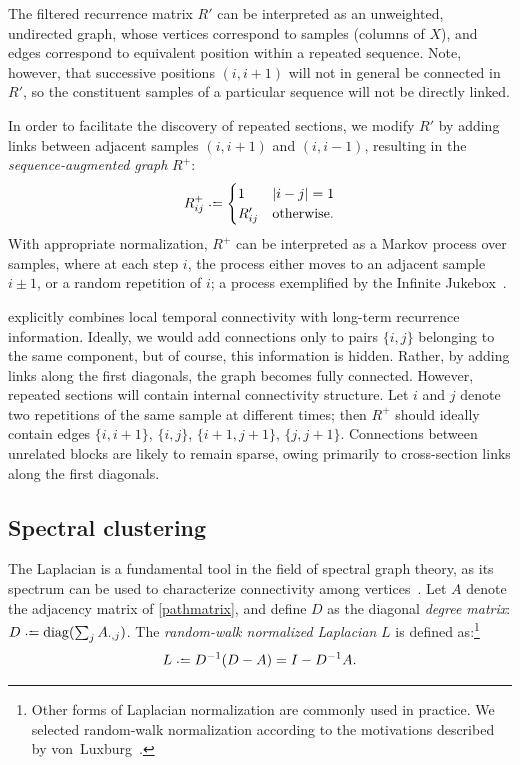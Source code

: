 \documentclass{article}
\begin{document}
The filtered recurrence matrix $R'$ can be interpreted as an unweighted, undirected 
graph, whose vertices correspond to samples (columns of $X$), and edges correspond 
to equivalent position within a repeated sequence. Note, however, that successive 
positions $(i, i+1)$ will not in general be connected in $R'$, so the constituent 
samples of a particular sequence will not be directly linked.

In order to facilitate the discovery of repeated sections, we modify $R'$ by 
adding links between adjacent samples $(i, i+1)$ and $(i, i-1)$, resulting in the
\emph{sequence-augmented graph} $R^+$:
\begin{equation}
R^+_{ij} \defeq \begin{cases}
1 & |i - j| = 1\\
R'_{ij} & \text{otherwise}.
\end{cases}\label{pathmatrix}
\end{equation}
With appropriate normalization, $R^+$ can be interpreted as a Markov process
over samples, where at each step $i$, the process either moves to an adjacent
sample $i\pm1$, or a random repetition of $i$; a process exemplified by the 
Infinite Jukebox~\cite{infinitejukebox}.

 explicitly combines local temporal connectivity with long-term
recurrence information.  Ideally, we would add connections only to pairs $\{i,j\}$
belonging to the same component, but of course, this information is hidden.  Rather,
by adding links along the first diagonals, the graph becomes fully connected.  
However, repeated sections will contain internal connectivity structure.  Let $i$ and
$j$ denote two repetitions of the same sample at different times; then $R^+$ should
ideally contain edges $\{i, i+1\}$, $\{i, j\}$, $\{i+1, j+1\}$, $\{j, j+1\}$.
Connections between unrelated blocks are likely to remain sparse, owing primarily to
cross-section links along the first diagonals.  


\subsection{Spectral clustering}

The Laplacian is a fundamental tool in the field of spectral graph
theory, as its spectrum can be used to characterize 
connectivity among vertices~\cite{chung1997spectral}.  
Let $A$ denote the adjacency matrix of \cref{pathmatrix}, and define $D$ as the
diagonal \emph{degree matrix}: $D \defeq \diag(\sum_{j} A_{\cdot, j})$.  The
\emph{random-walk normalized Laplacian} $L$ is defined as:\footnote{Other forms of
Laplacian normalization are commonly used in practice.  We selected random-walk
normalization according to the motivations described by 
von~Luxburg~\cite{von2007tutorial}.}
\begin{equation}
L \defeq D^{-1} (D - A) = I - D^{-1} A.\label{rwlaplacian}
\end{equation}
\end{document}
